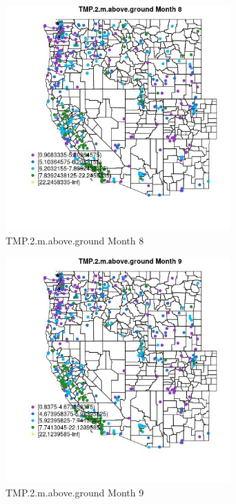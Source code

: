 \clearpage 

\begin{figure} 
\centering  
\includegraphics[width=0.77\textwidth]{Code_Outputs/ML_input_report_ML_input_PM25_Step5_part_d_de_duplicated_aves_ML_input_MapObsMo8TMP2maboveground.jpg} 
\caption{\label{fig:ML_input_report_ML_input_PM25_Step5_part_d_de_duplicated_aves_ML_inputMapObsMo8TMP2maboveground}TMP.2.m.above.ground Month 8} 
\end{figure} 
 

\begin{figure} 
\centering  
\includegraphics[width=0.77\textwidth]{Code_Outputs/ML_input_report_ML_input_PM25_Step5_part_d_de_duplicated_aves_ML_input_MapObsMo9TMP2maboveground.jpg} 
\caption{\label{fig:ML_input_report_ML_input_PM25_Step5_part_d_de_duplicated_aves_ML_inputMapObsMo9TMP2maboveground}TMP.2.m.above.ground Month 9} 
\end{figure} 
 

